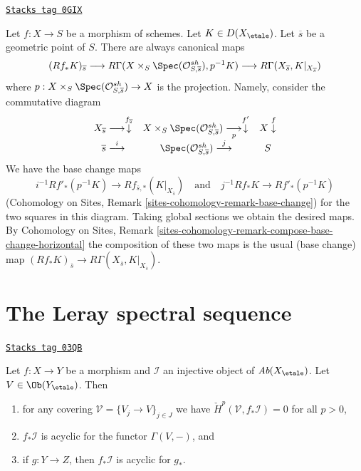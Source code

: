 \begin{remark}
\label{etale-cohomology-remark-stalk-fibre}
\href{https://stacks.math.columbia.edu/tag/0GIX}{\texttt{Stacks tag 0GIX}}

Let $f : X \to S$ be a morphism of schemes.
Let $K \in D(X_\etale)$.
Let $\overline{s}$ be a geometric point of $S$.
There are always canonical maps
$$
(Rf_*K)_{\overline{s}}
\longrightarrow
R\Gamma(X \times_S \Spec(\mathcal{O}_{S, \overline{s}}^{sh}), p^{-1}K)
\longrightarrow
R\Gamma(X_{\overline{s}}, K|_{X_{\overline{s}}})
$$
where $p : X \times_S \Spec(\mathcal{O}_{S, \overline{s}}^{sh}) \to X$
is the projection. Namely, consider the commutative diagram
$$
\begin{array}{ccc}X_{\overline{s}} \longrightarrow\overset{f_{\overline{s}}}{\downarrow} & X \times_S \Spec(\mathcal{O}_{S, \overline{s}}^{sh}) \underset{p}{\longrightarrow}\overset{f'}{\downarrow} & X \overset{f}{\downarrow} \\ \overline{s} \overset{i}{\longrightarrow} & \Spec(\mathcal{O}_{S, \overline{s}}^{sh}) \overset{j}{\longrightarrow} & S\end{array}
$$
We have the base change maps
$$
i^{-1}Rf'_*(p^{-1}K) \to Rf_{\overline{s}, *}(K|_{X_{\overline{s}}})
\quad\text{and}\quad
j^{-1}Rf_*K \to Rf'_*(p^{-1}K)
$$
(Cohomology on Sites, Remark \ref{sites-cohomology-remark-base-change})
for the two squares in this diagram.
Taking global sections we obtain the desired maps.
By Cohomology on Sites, Remark
\ref{sites-cohomology-remark-compose-base-change-horizontal}
the composition of these two maps is the
usual (base change) map
$(Rf_*K)_{\overline{s}} \to R\Gamma(X_{\overline{s}}, K|_{X_{\overline{s}}})$.
\end{remark}

\section{The Leray spectral sequence}
\label{etale-cohomology-section-leray}
\begin{lemma}
\label{etale-cohomology-lemma-prepare-leray}
\href{https://stacks.math.columbia.edu/tag/03QB}{\texttt{Stacks tag 03QB}}

Let $f: X \to Y$ be a morphism and $\mathcal{I}$ an injective object of
$\textit{Ab}(X_\etale)$. Let $V \in \Ob(Y_\etale)$. Then
\begin{enumerate}
\item for any covering $\mathcal{V} = \{V_j\to V\}_{j \in J}$ we have
$\check H^p(\mathcal{V}, f_*\mathcal{I}) = 0$ for all $p > 0$,
\item $f_*\mathcal{I}$ is acyclic for the functor $\Gamma(V, -)$, and
\item if $g : Y \to Z$, then $f_*\mathcal{I}$ is acyclic for $g_*$.
\end{enumerate}
\end{lemma}

